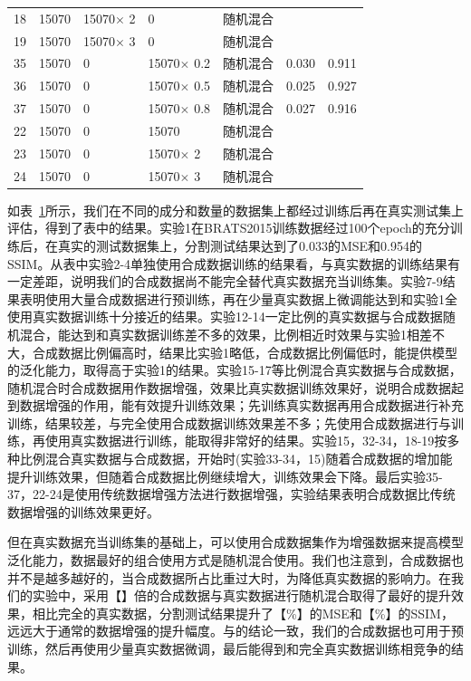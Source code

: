\documentclass[letterpaper]{article} %
\begin{document}
\begin{table}[t]
{\begin{tabular}{l|l|l|l|l|l|l}
			18& 15070 & 15070$\times$ 2  &0 &随机混合 & & \\
			19& 15070 & 15070$\times$ 3  &0 &随机混合 & & \\
			
			35& 15070 &0 & 15070$\times$ 0.2   &随机混合 &0.030 &0.911 \\
			36& 15070 &0 & 15070$\times$ 0.5   &随机混合 &0.025 &0.927 \\
			37& 15070 &0 & 15070$\times$ 0.8   &随机混合 &0.027 &0.916 \\
			22& 15070 &0 & 15070 &随机混合 & & \\
			23& 15070 &0 & 15070$\times$ 2 &随机混合 & & \\
			24& 15070 &0 & 15070$\times$ 3 &随机混合 & & \\
		\end{tabular}
	}
	\label{use_test}
\end{table}
如表~\ref{use_test}所示，我们在不同的成分和数量的数据集上都经过训练后再在真实测试集上评估，得到了表中的结果。实验1在BRATS2015训练数据经过100个epoch的充分训练后，在真实的测试数据集上，分割测试结果达到了0.033的MSE和0.954的SSIM。从表中实验2-4单独使用合成数据训练的结果看，与真实数据的训练结果有一定差距，说明我们的合成数据尚不能完全替代真实数据充当训练集。实验7-9结果表明使用大量合成数据进行预训练，再在少量真实数据上微调能达到和实验1全使用真实数据训练十分接近的结果。实验12-14一定比例的真实数据与合成数据随机混合，能达到和真实数据训练差不多的效果，比例相近时效果与实验1相差不大，合成数据比例偏高时，结果比实验1略低，合成数据比例偏低时，能提供模型的泛化能力，取得高于实验1的结果。实验15-17等比例混合真实数据与合成数据，随机混合时合成数据用作数据增强，效果比真实数据训练效果好，说明合成数据起到数据增强的作用，能有效提升训练效果；先训练真实数据再用合成数据进行补充训练，结果较差，与完全使用合成数据训练效果差不多；先使用合成数据进行与训练，再使用真实数据进行训练，能取得非常好的结果。实验15，32-34，18-19按多种比例混合真实数据与合成数据，开始时(实验33-34，15)随着合成数据的增加能提升训练效果，但随着合成数据比例继续增大，训练效果会下降。最后实验35-37，22-24是使用传统数据增强方法进行数据增强，实验结果表明合成数据比传统数据增强的训练效果更好。

但在真实数据充当训练集的基础上，可以使用合成数据集作为增强数据来提高模型泛化能力，数据最好的组合使用方式是随机混合使用。我们也注意到，合成数据也并不是越多越好的，当合成数据所占比重过大时，为降低真实数据的影响力。在我们的实验中，采用【】倍的合成数据与真实数据进行随机混合取得了最好的提升效果，相比完全的真实数据，分割测试结果提升了【\%】的MSE和【\%】的SSIM，远远大于通常的数据增强的提升幅度。与\cite{4shin2018medical}的结论一致，我们的合成数据也可用于预训练，然后再使用少量真实数据微调，最后能得到和完全真实数据训练相竞争的结果。
\end{document}
